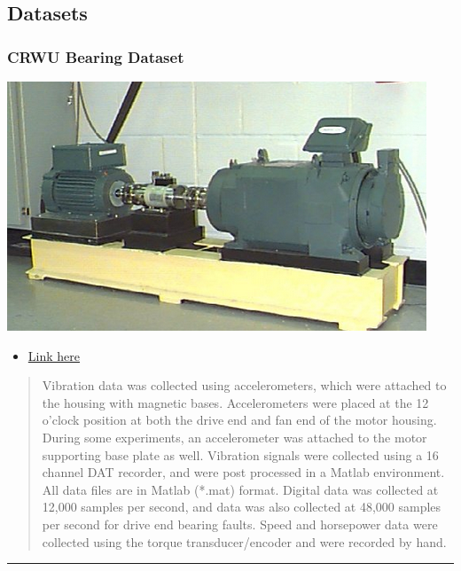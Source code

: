 \documentclass[
  letterpaper,
  DIV=11,
  numbers=noendperiod]{scrartcl}
\providecommand{\tightlist}{%
  \setlength{\itemsep}{0pt}\setlength{\parskip}{0pt}}\usepackage{longtable,booktabs,array}
\begin{document}
\hypertarget{datasets}{%
\subsection{Datasets}\label{datasets}}

\hypertarget{crwu-bearing-dataset}{%
\subsubsection{CRWU Bearing Dataset}\label{crwu-bearing-dataset}}

\includegraphics{img/2023-01-08-19-36-39.png}

\begin{itemize}
\tightlist
\item
  \href{https://engineering.case.edu/bearingdatacenter/download-data-file}{Link
  here}
\end{itemize}

\begin{quote}
Vibration data was collected using accelerometers, which were attached
to the housing with magnetic bases. Accelerometers were placed at the 12
o'clock position at both the drive end and fan end of the motor housing.
During some experiments, an accelerometer was attached to the motor
supporting base plate as well. Vibration signals were collected using a
16 channel DAT recorder, and were post processed in a Matlab
environment. All data files are in Matlab (*.mat) format. Digital data
was collected at 12,000 samples per second, and data was also collected
at 48,000 samples per second for drive end bearing faults. Speed and
horsepower data were collected using the torque transducer/encoder and
were recorded by hand.
\end{quote}

\begin{center}\rule{0.5\linewidth}{0.5pt}\end{center}
\end{document}

